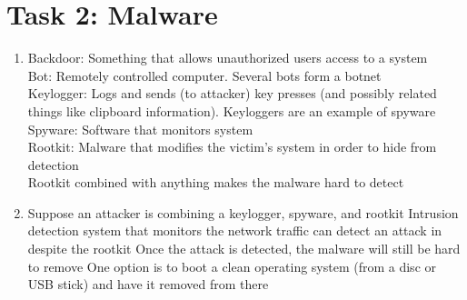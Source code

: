 \section*{Task 2: Malware}
\begin{enumerate}
\item %
  Backdoor: Something that allows unauthorized users access to a system\\
  Bot: Remotely controlled computer. Several bots form a botnet\\
  Keylogger: Logs and sends (to attacker) key presses (and possibly related things like clipboard information). Keyloggers are an example of spyware\\
  Spyware: Software that monitors system\\
  Rootkit: Malware that modifies the victim's system in order to hide from detection\\

  Rootkit combined with anything makes the malware hard to detect
\item %
  Suppose an attacker is combining a keylogger, spyware, and rootkit
Intrusion detection system that monitors the network traffic can detect an attack in despite the rootkit
Once the attack is detected, the malware will still be hard to remove
One option is to boot a clean operating system (from a disc or USB stick) and have it removed from there
  
\end{enumerate}
